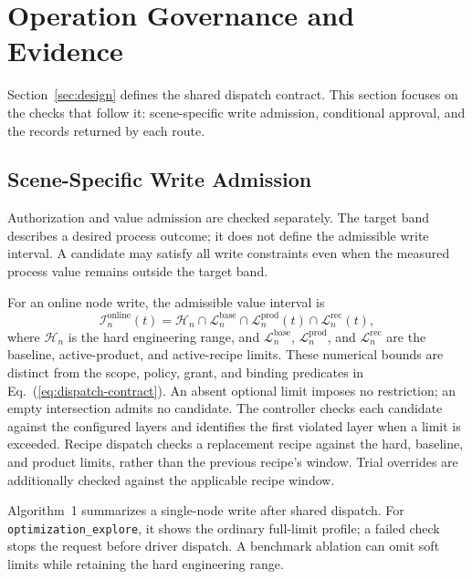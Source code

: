 \section{Operation Governance and Evidence}
\label{sec:modules}
Section~\ref{sec:design} defines the shared dispatch contract. This section
focuses on the checks that follow it: scene-specific write admission,
conditional approval, and the records returned by each route.

\subsection{Scene-Specific Write Admission}
\label{sec:governed}
Authorization and value admission are checked separately. The target band describes a desired
process outcome; it does not define the admissible write interval. A candidate may
satisfy all write constraints even when the measured process value remains outside
the target band.

For an online node write, the admissible value interval is
\begin{equation}
\mathcal{I}^{\mathrm{online}}_n(t)=
\mathcal{H}_n\cap\mathcal{L}^{\mathrm{base}}_n\cap\mathcal{L}^{\mathrm{prod}}_n(t)\cap\mathcal{L}^{\mathrm{rec}}_n(t),
\label{eq:admission}
\end{equation}
where $\mathcal{H}_n$ is the hard engineering range, and
$\mathcal{L}^{\mathrm{base}}_n$, $\mathcal{L}^{\mathrm{prod}}_n$, and
$\mathcal{L}^{\mathrm{rec}}_n$ are the baseline, active-product, and
active-recipe limits. These numerical bounds are distinct from the scope,
policy, grant, and binding predicates in Eq.~(\ref{eq:dispatch-contract}).
An absent optional limit imposes no restriction; an empty intersection admits no
candidate. The controller checks each candidate against the configured layers
and identifies the first violated layer when a limit is exceeded. Recipe dispatch
checks a replacement recipe against the hard, baseline, and product limits,
rather than the previous recipe's window. Trial overrides are additionally checked against
the applicable recipe window.

Algorithm~1 summarizes a single-node write after shared dispatch. For
\texttt{optimization\_explore}, it shows the ordinary full-limit profile; a failed
check stops the request before driver dispatch. A benchmark ablation can
omit soft limits while retaining the hard engineering range.

